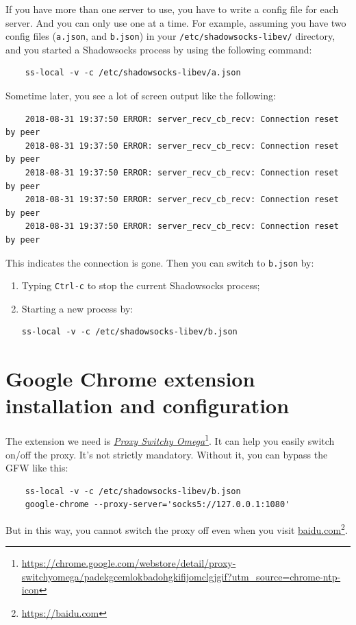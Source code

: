 \documentclass[12pt]{wx672article}
\begin{document}
If you have more than one server to use, you have to write a config file for each
server. And you can only use one at a time. For example, assuming you have two config
files (\texttt{a.json}, and \texttt{b.json}) in your \texttt{/etc/shadowsocks-libev/} directory, and 
you started a Shadowsocks process by using the following command:
\begin{verbatim}
    ss-local -v -c /etc/shadowsocks-libev/a.json
\end{verbatim}
Sometime later, you see a lot of screen output like the following:
\begin{footnotesize}
\begin{verbatim}
    2018-08-31 19:37:50 ERROR: server_recv_cb_recv: Connection reset by peer
    2018-08-31 19:37:50 ERROR: server_recv_cb_recv: Connection reset by peer
    2018-08-31 19:37:50 ERROR: server_recv_cb_recv: Connection reset by peer
    2018-08-31 19:37:50 ERROR: server_recv_cb_recv: Connection reset by peer
    2018-08-31 19:37:50 ERROR: server_recv_cb_recv: Connection reset by peer
\end{verbatim}
\end{footnotesize}
This indicates the connection is gone. Then you can switch to \texttt{b.json} by:
\begin{enumerate}
\item Typing \texttt{Ctrl-c} to stop the current Shadowsocks process;
\item Starting a new process by:
\begin{verbatim}
ss-local -v -c /etc/shadowsocks-libev/b.json
\end{verbatim}
\end{enumerate}

\section{Google Chrome extension installation and configuration}
\label{sec:org856d758}
The extension we need is \href{https://chrome.google.com/webstore/detail/proxy-switchyomega/padekgcemlokbadohgkifijomclgjgif?utm\_source=chrome-ntp-icon}{\emph{Proxy Switchy Omega}}\footnote{\url{https://chrome.google.com/webstore/detail/proxy-switchyomega/padekgcemlokbadohgkifijomclgjgif?utm\_source=chrome-ntp-icon}}. It can help you easily switch on/off the
proxy. It's not strictly mandatory. Without it, you can bypass the GFW like this:
\begin{verbatim}
    ss-local -v -c /etc/shadowsocks-libev/b.json
    google-chrome --proxy-server='socks5://127.0.0.1:1080'
\end{verbatim}
But in this way, you cannot switch the proxy off even when you visit \href{https://baidu.com}{baidu.com}\footnote{\url{https://baidu.com}}.
\end{document}
